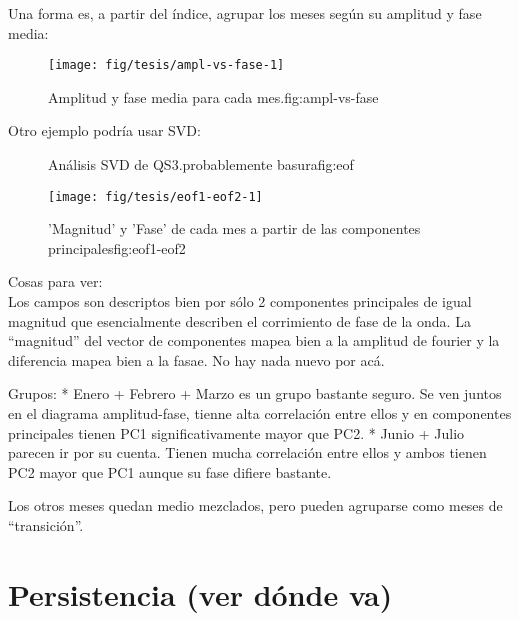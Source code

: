 \documentclass[spanish,a4paper]{book}
\begin{document}
Una forma es, a partir del índice, agrupar los meses según su amplitud y
fase media:

\begin{figure}
\texttt{[image: fig/tesis/ampl-vs-fase-1]} \caption{Amplitud y fase media para cada mes.{fig:ampl-vs-fase}}\label{fig:ampl-vs-fase}
\end{figure}

Otro ejemplo podría usar SVD:

\begin{figure}
\newline{}\newline{}\caption{Análisis SVD de QS3.probablemente basura{fig:eof}}\label{fig:eof}
\end{figure}

\begin{figure}
\texttt{[image: fig/tesis/eof1-eof2-1]} \caption{'Magnitud' y 'Fase' de cada mes a partir de las componentes principales{fig:eof1-eof2}}\label{fig:eof1-eof2}
\end{figure}

Cosas para ver:\\
Los campos son descriptos bien por sólo 2 componentes principales de
igual magnitud que esencialmente describen el corrimiento de fase de la
onda. La ``magnitud'' del vector de componentes mapea bien a la amplitud
de fourier y la diferencia mapea bien a la fasae. No hay nada nuevo por
acá.

Grupos: * Enero + Febrero + Marzo es un grupo bastante seguro. Se ven
juntos en el diagrama amplitud-fase, tienne alta correlación entre ellos
y en componentes principales tienen PC1 significativamente mayor que
PC2. * Junio + Julio parecen ir por su cuenta. Tienen mucha correlación
entre ellos y ambos tienen PC2 mayor que PC1 aunque su fase difiere
bastante.

Los otros meses quedan medio mezclados, pero pueden agruparse como meses
de ``transición''.

\section{Persistencia (ver dónde va)}\label{persistencia-ver-donde-va}
\end{document}
